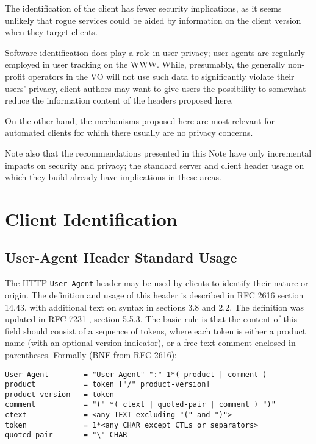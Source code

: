 \documentclass[11pt,a4paper]{ivoa}
\newcommand{\headername}[1]{{\tt #1}}
\begin{document}
The identification of the client has fewer security implications, as it
seems unlikely that rogue services could be aided by information on the
client version when they target clients.

Software identification does play a role in user privacy; user agents
are regularly employed in user tracking on the WWW.  While, presumably,
the generally non-profit operators in the VO will not use such data to
significantly violate their users' privacy, client authors may want to
give users the possibility to somewhat reduce the information content of
the headers proposed here.

On the other hand, the mechanisms proposed here are most relevant for
automated clients for which there usually are no privacy concerns.

Note also that the recommendations presented in this Note
have only incremental impacts on security and privacy;
the standard server and client header usage on which they
build already have implications in these areas.


\section{Client Identification}
\label{sect:client}

\subsection{User-Agent Header Standard Usage}
\label{sect:user-agent}

The HTTP \headername{User-Agent} header may be used by clients
to identify their
nature or origin. The definition and usage of this header is described
in RFC 2616 \citep{std:HTTP} section 14.43, with additional text on
syntax in sections 3.8 and 2.2.
The definition was updated in RFC 7231 \citep{std:RFC7231}, section 5.5.3.
The basic rule is that the content of
this field should consist of a sequence of tokens, where each token is
either a product name (with an optional version indicator), or a
free-text comment enclosed in parentheses. Formally (BNF from RFC 2616):

\begin{verbatim}
User-Agent        = "User-Agent" ":" 1*( product | comment )
product           = token ["/" product-version]
product-version   = token
comment           = "(" *( ctext | quoted-pair | comment ) ")"
ctext             = <any TEXT excluding "(" and ")">
token             = 1*<any CHAR except CTLs or separators>
quoted-pair       = "\" CHAR
\end{verbatim}
\end{document}
